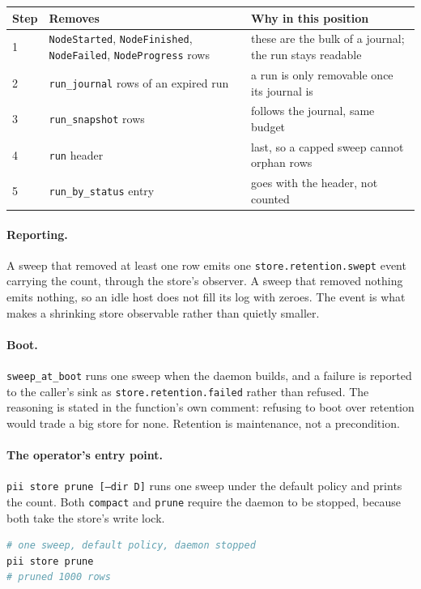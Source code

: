 \begin{longtable}{@{}p{}p{}p{}@{}}
\toprule
\textbf{Step} & \textbf{Removes} & \textbf{Why in this position} \\
\midrule
\endhead
1 & \texttt{NodeStarted}, \texttt{NodeFinished}, \texttt{NodeFailed}, \texttt{NodeProgress} rows &
these are the bulk of a journal; the run stays readable \\
2 & \texttt{run\_journal} rows of an expired run & a run is only removable once its journal is \\
3 & \texttt{run\_snapshot} rows & follows the journal, same budget \\
4 & \texttt{run} header & last, so a capped sweep cannot orphan rows \\
5 & \texttt{run\_by\_status} entry & goes with the header, not counted \\
\bottomrule
\end{longtable}

\paragraph{Reporting.} A sweep that removed at least one row emits one
\texttt{store.retention.swept} event carrying the count, through the store's observer. A sweep
that removed nothing emits nothing, so an idle host does not fill its log with zeroes. The
event is what makes a shrinking store observable rather than quietly smaller.

\paragraph{Boot.} \texttt{sweep\_at\_boot} runs one sweep when the daemon builds, and a
failure is reported to the caller's sink as \texttt{store.retention.failed} rather than
refused. The reasoning is stated in the function's own comment: refusing to boot over
retention would trade a big store for none. Retention is maintenance, not a precondition.

\paragraph{The operator's entry point.} \texttt{pii store prune [--dir D]} runs one sweep
under the default policy and prints the count. Both \texttt{compact} and \texttt{prune}
require the daemon to be stopped, because both take the store's write lock.

\begin{lstlisting}[language=bash]
# one sweep, default policy, daemon stopped
pii store prune
# pruned 1000 rows
\end{lstlisting}


